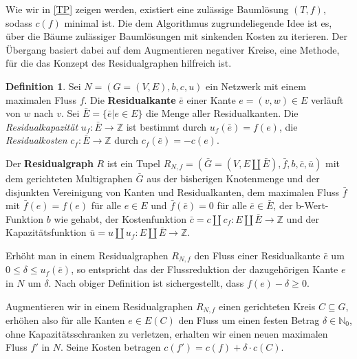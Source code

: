 \documentclass[a4paper,twoside,ngerman]{report}
\theoremstyle{plain}
\theoremstyle{definition}
\newtheorem{defn}[thm]{Definition}
\begin{document}
Wie wir in \cref{TP} zeigen werden, existiert eine zulässige Baumlösung $(T,f)$, sodass $c(f)$ minimal ist. Die dem Algorithmus zugrundeliegende Idee ist es, über die Bäume zulässiger Baumlösungen mit sinkenden Kosten zu iterieren. Der Übergang basiert dabei auf dem Augmentieren negativer Kreise, eine Methode, für die das Konzept des Residualgraphen hilfreich ist.

\begin{defn}\label{defRes}Sei $N=(G=(V,E),b,c,u)$ ein Netzwerk mit einem maximalen Fluss $f$. Die \textbf{Residualkante} $\bar{e}$ einer Kante $e=(v,w)\in E$ verläuft von $w$ nach $v$. Sei $\bar{E}=\{\bar{e}|e\in E\}$ die Menge aller Residualkanten. Die \textit{Residualkapazität} $u_f:\bar{E}\rightarrow\mathbb{Z}$ ist bestimmt durch $u_f(\bar{e})=f(e)$, die \textit{Residualkosten} $c_f:\bar{E}\rightarrow\mathbb{Z}$ durch $c_f(\bar{e})=-c(e)$.

Der \textbf{Residualgraph} $R$ ist ein Tupel $R_{N,f}=(\bar{G}=(V,E\amalg\bar{E}),\bar{f},b,\bar{c},\bar{u})$ mit dem gerichteten Multigraphen $\bar{G}$ aus der bisherigen Knotenmenge und der disjunkten Vereinigung von Kanten und Residualkanten, dem maximalen Fluss $\bar{f}$ mit $\bar{f}(e)=f(e)$ für alle $e\in E$ und $\bar{f}(\bar{e})=0$ für alle $\bar{e}\in\bar{E}$, der b-Wert-Funktion $b$ wie gehabt, der Kostenfunktion $\bar{c}=c\amalg c_f:E\amalg\bar{E}\rightarrow\mathbb{Z}$ und der Kapazitätsfunktion $\bar{u}=u\amalg u_f:E\amalg\bar{E}\rightarrow\mathbb{Z}$. 
\end{defn}

Erhöht man in einem Residualgraphen $R_{N,f}$ den Fluss einer Residualkante $\bar{e}$ um $0\leq\delta\leq u_f(\bar{e})$, so entspricht das der Flussreduktion der dazugehörigen Kante $e$ in $N$ um $\delta$. Nach obiger Definition ist sichergestellt, dass $f(e)-\delta\geq0$.

Augmentieren wir in einem Residualgraphen $R_{N,f}$ einen gerichteten Kreis $C\subseteq G$, erhöhen also für alle Kanten $e\in E(C)$ den Fluss um einen festen Betrag $\delta\in\mathbb{N}_0$, ohne Kapazitätsschranken zu verletzen, erhalten wir einen neuen maximalen Fluss $f'$ in $N$. Seine Kosten betragen $c(f')=c(f) + \delta\cdot c(C)$.
\end{document}
